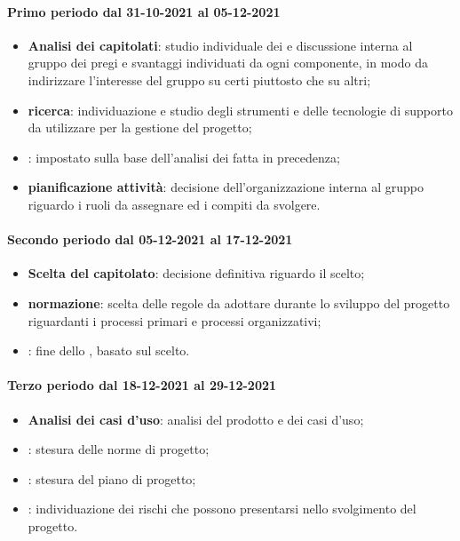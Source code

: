 	\paragraph{Primo periodo dal 31-10-2021 al 05-12-2021}
	\begin{itemize}
	\item \textbf{Analisi dei capitolati}: studio individuale dei  e discussione interna al gruppo dei pregi e svantaggi individuati da ogni componente, in modo da indirizzare l’interesse del gruppo su certi  piuttosto che su altri;
	\item \textbf{ricerca}: individuazione e studio degli strumenti e delle tecnologie di supporto da utilizzare per
	la gestione del progetto;
	\item \textbf{}: impostato sulla base dell'analisi dei  fatta in precedenza;
	\item \textbf{pianificazione attività}: decisione dell'organizzazione interna al gruppo riguardo i ruoli
	da assegnare ed i compiti da svolgere.
	\end{itemize}
	
	\paragraph{Secondo periodo dal 05-12-2021 al 17-12-2021}
	\begin{itemize}
	\item \textbf{Scelta del capitolato}: decisione definitiva riguardo il  scelto;
	\item \textbf{normazione}: scelta delle regole da adottare durante lo sviluppo del progetto riguardanti i
	processi primari e processi organizzativi;
	\item \textbf{}: fine dello , basato sul  scelto.
	\end{itemize}
	
	\paragraph{Terzo periodo dal 18-12-2021 al 29-12-2021}
	\begin{itemize}
		\item \textbf{Analisi dei casi d'uso}: analisi del prodotto e dei casi d’uso;
		\item \textbf{}: stesura delle norme di progetto;
		\item \textbf{}: stesura del piano di progetto;
		\item \textbf{}: individuazione dei rischi che possono presentarsi nello svolgimento del progetto.
	\end{itemize}
	
